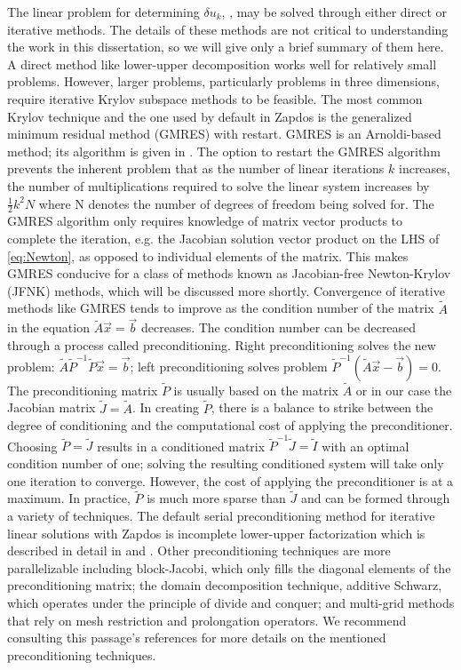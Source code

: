 The linear problem for determining $\delta u_k$, , may be solved through either direct or iterative methods. The details of these methods are not critical to understanding the work in this dissertation, so we will give only a brief summary of them here. A direct method like lower-upper decomposition works well for relatively small problems. However, larger problems, particularly problems in three dimensions, require iterative Krylov subspace methods to be feasible. \cite{heil2008solvers} The most common Krylov technique and the one used by default in Zapdos is the generalized minimum residual method (GMRES) with restart. GMRES is an Arnoldi-based method; its algorithm is given in \cite{saad1986gmres}. The option to restart the GMRES algorithm prevents the inherent problem that as the number of linear iterations $k$ increases, the number of multiplications required to solve the linear system increases by $\frac{1}{2}k^2N$ where N denotes the number of degrees of freedom being solved for. \cite{saad1986gmres} The GMRES algorithm only requires knowledge of matrix vector products to complete the iteration, e.g. the Jacobian solution vector product on the LHS of \cref{eq:Newton}, as opposed to individual elements of the matrix. \cite{knoll2004jacobian} This makes GMRES conducive for a class of methods known as Jacobian-free Newton-Krylov (JFNK) methods, which will be discussed more shortly. Convergence of iterative methods like GMRES tends to improve as the condition number of the matrix $\tilde{A}$ in the equation $\tilde{A}\vec{x} = \vec{b}$ decreases. The condition number can be decreased through a process called preconditioning. Right preconditioning solves the new problem: $\tilde{A}\tilde{P}^{-1}\tilde{P}\vec{x} = \vec{b}$; left preconditioning solves problem $\tilde{P}^{-1}(\tilde{A}\vec{x} - \vec{b}) = 0$. The preconditioning matrix $\tilde{P}$ is usually based on the matrix $\tilde{A}$ or in our case the Jacobian matrix $\tilde{J}=\tilde{A}$. In creating $\tilde{P}$, there is a balance to strike between the degree of conditioning and the computational cost of applying the preconditioner. Choosing $\tilde{P}=\tilde{J}$ results in a conditioned matrix $\tilde{P}^{-1}\tilde{J}=\tilde{I}$ with an optimal condition number of one; solving the resulting conditioned system will take only one iteration to converge. However, the cost of applying the preconditioner is at a maximum. In practice, $\tilde{P}$ is much more sparse than $\tilde{J}$ and can be formed through a variety of techniques. The default serial preconditioning method for iterative linear solutions with Zapdos is incomplete lower-upper factorization which is described in detail in \cite{dupont1968approximate} and \cite{saad1996iterative}. Other preconditioning techniques are more parallelizable including block-Jacobi, which only fills the diagonal elements of the preconditioning matrix; \cite{saad1996iterative} the domain decomposition technique, additive Schwarz, which operates under the principle of divide and conquer; \cite{saad1996iterative} and multi-grid methods that rely on mesh restriction and prolongation operators. \cite{knoll2004jacobian} We recommend consulting this passage's references for more details on the mentioned preconditioning techniques.

